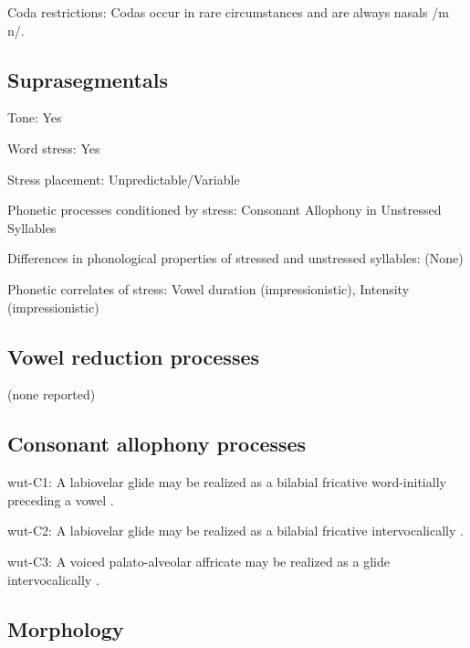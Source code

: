 {\begin{appendixdesc}
\item[Coda restrictions:] Codas occur in rare circumstances and are always nasals /m n/.
\end{appendixdesc}
\subsection*{Suprasegmentals}
\begin{appendixdesc}
\item[Tone:] Yes

\item[Word stress:] Yes

\item[Stress placement:] Unpredictable/Variable

\item[Phonetic processes conditioned by stress:] Consonant Allophony in Unstressed Syllables

\item[Differences in phonological properties of stressed and unstressed syllables:] (None)

\item[Phonetic correlates of stress:] Vowel duration (impressionistic), Intensity (impressionistic)
\end{appendixdesc}
\subsection*{Vowel reduction processes}

(none reported)
\subsection*{Consonant allophony processes}
\begin{appendixdesc}

\item[wut-C1:] A labiovelar glide may be realized as a bilabial fricative word-initially preceding a vowel \citep[57--58]{Marmion2010}.

\item[wut-C2:] A labiovelar glide may be realized as a bilabial fricative intervocalically \citep[57--58]{Marmion2010}.

\item[wut-C3:] A voiced palato-alveolar affricate may be realized as a glide intervocalically \citep[55]{Marmion2010}.
\end{appendixdesc}
\subsection*{Morphology}

}
